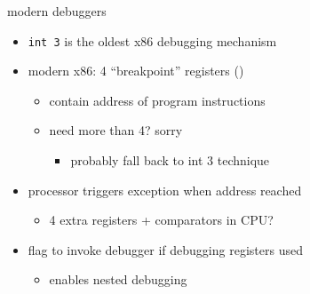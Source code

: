 
\begin{frame}{modern debuggers}
    \begin{itemize}
    \item {\tt int 3} is the oldest x86 debugging mechanism
    \item modern x86: 4 ``breakpoint'' registers ()
        \begin{itemize}
        \item contain address of program instructions
        \item need more than 4? sorry
            \begin{itemize}
            \item probably fall back to int 3 technique
            \end{itemize}
        \end{itemize}
    \item processor triggers exception when address reached
        \begin{itemize}
        \item 4 extra registers + comparators in CPU?
        \end{itemize}
    \item flag to invoke debugger if debugging registers used
        \begin{itemize}
        \item enables nested debugging
        \end{itemize}
    \end{itemize}
\end{frame}
